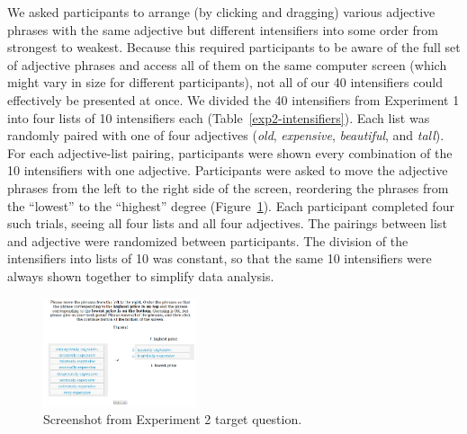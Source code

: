 \documentclass[10pt,letterpaper]{article}
\newcommand{\w}[1]{\emph{#1}}
\begin{document}
We asked participants to arrange (by clicking and dragging) various adjective phrases with the same adjective but different intensifiers into some order from strongest to weakest. Because this required participants to be aware of the full set of adjective phrases and access all of them on the same computer screen (which might vary in size for different participants), not all of our 40 intensifiers could effectively be presented at once. We divided the 40 intensifiers from Experiment 1 into four lists of 10 intensifiers each (Table~\ref{exp2-intensifiers}).
Each list was randomly paired with one of four adjectives (\w{old}, \w{expensive}, \w{beautiful}, and \w{tall}).
For each adjective-list pairing, participants were shown every combination of the 10 intensifiers with one adjective.
Participants were asked to move the adjective phrases from the left to the right side of the screen, reordering the phrases from the ``lowest'' to the ``highest'' degree (Figure~\ref{exp2-q}).
Each participant completed four such trials, seeing all four lists and all four adjectives.
The pairings between list and adjective were randomized between participants.
The division of the intensifiers into lists of 10 was constant, so that the same 10 intensifiers were always shown together to simplify data analysis.

\begin{figure}[ht]
\begin{center}
\includegraphics[width=0.4\textwidth]{analysis_files_for_writeup/images/exp2-q.png}
\end{center}
\caption{Screenshot from Experiment 2 target question.} 
\label{exp2-q}
\end{figure}
\end{document}
